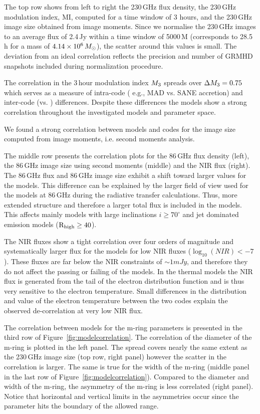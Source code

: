 The top row shows from left to right the 230\,GHz flux density, the 230\,GHz modulation index, MI, computed for a time window of 3 hours, and the 230\,GHz image size obtained from image moments. Since we normalise the 230\,GHz images to an average flux of 2.4\,Jy within a time window of 5000\,M (corresponds to 28.5 h for \sgra a mass of $4.14\times 10^6\,M_\odot$), the scatter around this values is small. The deviation from an ideal correlation reflects the precision and number of GRMHD snapshots included during normalization procedure.

The correlation in the 3\,hour modulation index $M_{3}$ spreads over $\Delta M_{3}=0.75$ which serves as a measure of intra-code ( e.g., MAD vs. SANE accretion) and inter-code (\bhac vs. \kharma) differences. Despite these differences the models show a strong correlation throughout the investigated models and parameter space.

We found a strong correlation between models and codes for the image size computed from image moments, i.e. second moments analysis.

The middle row presents the correlation plots for the 86\,GHz flux density (left), the 86\,GHz image size using second moments (middle) and the NIR flux (right). The 86\,GHz flux and 86\,GHz image size exhibit a shift toward larger values for the \bhac models. This difference can be explained by the larger field of view used for the \bhac models at 86\,GHz during the radiative transfer calculations. Thus, more extended structure and therefore a larger total flux is included in the \bhac models. This affects mainly models with large inclinations $i\geq70^\circ$ and jet dominated emission models ($\rm{R}_{\rm high}\geq 40$).

The NIR fluxes show a tight correlation over four orders of magnitude and systematically larger flux for the \bhac models for low NIR fluxes ($\log_{10}(NIR)<-7$). These fluxes are far below the NIR constraints of $\sim 1mJy$, and therefore they do not affect the passing or failing of the models. In the thermal models the NIR flux is generated from the tail of the electron distribution function and is thus very sensitive to the electron temperature. Small differences in the distribution and value of the electron temperature between the two codes explain the observed de-correlation at very low NIR flux.

The correlation between models for the m-ring parameters is presented in the third row of Figure~\ref{fig:modelcorrelation}. The correlation of the diameter of the m-ring is plotted in the left panel. The spread covers nearly the same extent as the 230\,GHz image size (top row, right panel) however the scatter in the correlation is larger.  The same is true for the width of the m-ring (middle panel in the last row of Figure~\ref{fig:modelcorrelation}). Compared to the diameter and width of the m-ring, the asymmetry of the m-ring is less correlated (right panel). Notice that horizontal and vertical limits in the asymmetries occur since the parameter hits the boundary of the allowed range.

